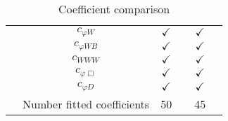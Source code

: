 \documentclass{article}
\begin{document}
\begin{table}[H]
\begin{tabular}{|c|c|c|c|c|c|}
 & $c_{\varphi W}$ & $\checkmark$ &  & $\checkmark$ & \\ \cline{2-6}
 & $c_{\varphi WB}$ & $\checkmark$ &  & $\checkmark$ & \\ \cline{2-6}
 & $c_{WWW}$ & $\checkmark$ &  & $\checkmark$ & \\ \cline{2-6}
 & $c_{\varphi \Box}$ & $\checkmark$ &  & $\checkmark$ & \\ \cline{2-6}
 & $c_{\varphi D}$ & $\checkmark$ &  & $\checkmark$ & 
\\ \hline
\hline & Number fitted coefficients & 50 &  & 45 &  \\ \hline
\end{tabular}
\caption{Coefficient comparison}
\end{table}
\end{document}
